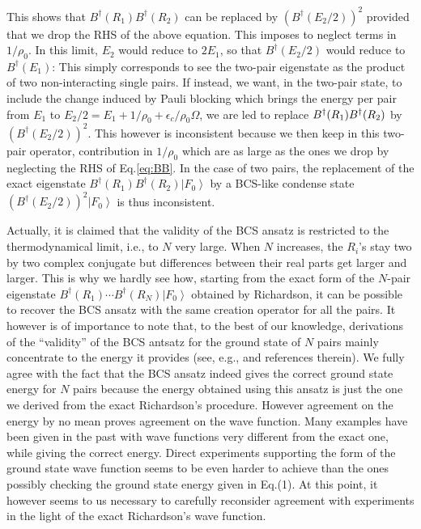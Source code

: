 \documentclass[aps,prb,superscriptaddress,twocolumn]{revtex4}
\begin{document}
This shows that $B^{\dagger}(R_1)B^{\dagger}(R_2)$ can be
replaced by $\left(B^{\dagger}(E _2/2)\right) ^2$ provided that we
drop the RHS of the above equation. This imposes to neglect terms in $1/\rho_0$. 
In this limit, $E_2$ would reduce to $2E_1$, so that $B^{\dagger}(E _2/2)$ would reduce to $%
B^{\dagger}(E _1)$: This simply corresponds to see the
two-pair eigenstate as the product of two non-interacting single pairs. If
instead, we want, in the two-pair state, to include the
change induced by Pauli blocking which brings the
energy per pair from $E _1$ to $E _2/2=E
_1+1/\rho_0+\epsilon_c/\rho_0\Omega$, we are led to replace $B^{\dagger}(R_1)B^{%
\dagger}(R_2)$ by $\left(B^{\dagger}(E _2/2)\right) ^2$. This
however is inconsistent because we then keep in this two-pair
operator, contribution in $1/\rho_0$ which are as large as the ones we drop
by neglecting the RHS of Eq.\eqref{eq:BB}. In the case of two pairs, the replacement of
the exact eigenstate $B^{\dagger}(R_1)B^{\dagger}(R_2)\left|F_0\right>  $ by
a BCS-like condense state $\left(B^{\dagger}(E _2/2)\right)
^2\left|F_0\right>  $ is thus inconsistent.

Actually, it is claimed that the validity of the BCS ansatz is restricted to the thermodynamical
limit, i.e., to $N$ very large. When $N$ increases, the $R_i$'s stay two by two complex conjugate but differences between their real parts get larger and larger. This is why we hardly see how, 
starting from the exact form of the $N$-pair eigenstate $B^{\dagger}(R_1)\cdots{}B^{\dagger}(R_N)\left|F_0\right>  $ 
obtained by Richardson, it can be possible to recover the BCS ansatz with the same 
creation operator for all the pairs. It however is of importance to note that, 
to the best of our knowledge,  derivations of the ``validity'' of the BCS antsatz for the ground state of $N$ pairs
mainly concentrate to the energy it provides 
(see, e.g., \cite{Schrieffer} and references therein).
 We fully agree with the fact that the BCS
ansatz indeed gives the correct ground state energy for $N$ pairs because the energy obtained using this ansatz
is just the one we derived from the exact Richardson's procedure. However
agreement on the energy by no mean proves agreement on the wave function.
Many examples have been given in the past with wave functions very different
from the exact one, while giving the correct energy. Direct
experiments supporting the form of the ground state wave function seems to be even harder to achieve than the ones possibly checking the ground state energy given in Eq.(1). 
At this point, it however seems to us necessary to carefully reconsider agreement 
with experiments in the light of the exact Richardson's wave function.  
\end{document}
